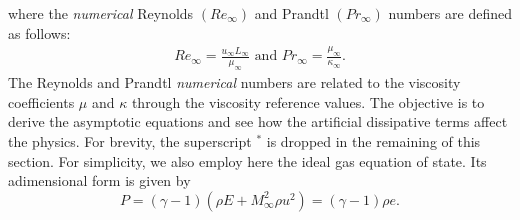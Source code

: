 \documentclass[preprint,10pt]{elsarticle}
\begin{document}
where the \emph{numerical} Reynolds $(Re_{\infty})$ and Prandtl $(Pr_{\infty})$ numbers are defined as follows:
\begin{eqnarray}
\label{eq:ref_numb}
Re_{\infty} = \frac{u_{\infty} L_{\infty}}{\mu_{\infty}} \text{ and }
Pr_{\infty} = \frac{\mu_{\infty}}{\kappa_{\infty}} \text{.}
\end{eqnarray}
The Reynolds and Prandtl \emph{numerical} numbers are related to the viscosity coefficients $\mu$ and $\kappa$ through the viscosity reference values. The objective is to derive the asymptotic equations and see how the artificial dissipative terms affect the physics. 
For brevity, the superscript $^*$ is dropped in the remaining of this section. For simplicity, we also employ here the ideal gas equation of state. Its adimensional form is given by
%
\begin{equation}
\label{eq:euler_eq2_eos}
P = \left( \gamma-1 \right) \left( \rho E + M_{\infty}^2 \rho u^2 \right) = \left( \gamma-1 \right) \rho e.
\end{equation}
%
\end{document}
